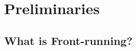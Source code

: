 


\section{Preliminaries}

\subsection{What is Front-running?} %
\label{sec:What is front-running?}

